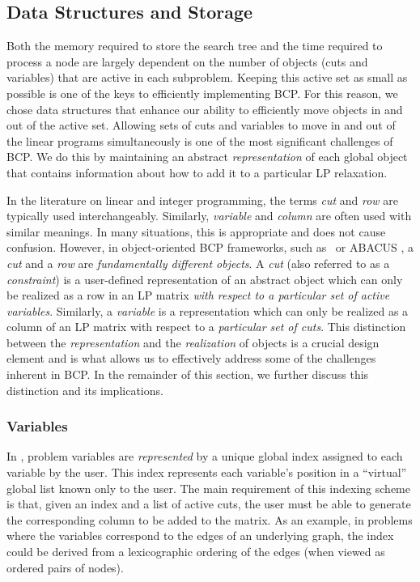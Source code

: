 \subsection{Data Structures and Storage}
\label{data-structures}

Both the memory required to store the search tree and the time
required to process a node are largely dependent on the number of
objects (cuts and variables) that are active in each subproblem.
Keeping this active set as small as possible is one of the keys to
efficiently implementing BCP. For this reason, we chose data
structures that enhance our ability to efficiently move objects in and
out of the active set. Allowing sets of cuts and variables to move in
and out of the linear programs simultaneously is one of the most
significant challenges of BCP. We do this by maintaining an abstract
{\em representation} of each global object that contains information
about how to add it to a particular LP relaxation. 

In the literature on linear and integer programming, the terms {\em
cut} and {\em row} are typically used interchangeably. Similarly, {\em
variable} and {\em column} are often used with similar meanings. In
many situations, this is appropriate and does not cause confusion.
However, in object-oriented BCP frameworks, such as \BB\ or ABACUS
\cite{abacus1}, a {\em cut} and a {\em row} are {\em fundamentally
different objects}. A {\em cut} (also referred to as a {\em
constraint}) is a user-defined representation of an abstract object
which can only be realized as a row in an LP matrix {\em with respect
to a particular set of active variables}. Similarly, a {\em variable}
is a representation which can only be realized as a column of an LP
matrix with respect to a {\em particular set of cuts}. This
distinction between the {\em representation} and the {\em realization}
of objects is a crucial design element and is what allows us to
effectively address some of the challenges inherent in BCP. In the
remainder of this section, we further discuss this distinction
and its implications.


\subsubsection{Variables}
\label{variables}

In \BB, problem variables are {\em represented} by a unique global
index assigned to each variable by the user. This index represents
each variable's position in a ``virtual'' global list known only to
the user. The main requirement of this indexing scheme is that, given
an index and a list of active cuts, the user must be able to generate
the corresponding column to be added to the matrix. As an example, in
problems where the variables correspond to the edges of an underlying
graph, the index could be derived from a lexicographic ordering of the
edges (when viewed as ordered pairs of nodes).

